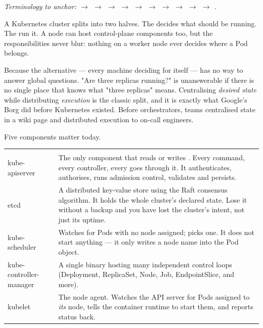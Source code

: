 \begin{center}\small\itshape\color{cInk!70}
Terminology to anchor:  $\rightarrow$  $\rightarrow$  $\rightarrow$  $\rightarrow$  $\rightarrow$  $\rightarrow$  $\rightarrow$  $\rightarrow$  $\rightarrow$  $\rightarrow$ .
\end{center}



 A Kubernetes cluster splits into two halves. The  decides what should be running. The  run it. A node can host control-plane components too, but the responsibilities never blur: nothing on a worker node ever decides where a Pod belongs.

 Because the alternative --- every machine deciding for itself --- has no way to answer global questions. "Are three replicas running?" is unanswerable if there is no single place that knows what "three replicas" means. Centralising \emph{desired state} while distributing \emph{execution} is the classic split, and it is exactly what Google's Borg did before Kubernetes existed. Before orchestrators, teams centralised state in a wiki page and distributed execution to on-call engineers.

 Five components matter today.

\begin{center}\small
\wbrowcolors
\begin{tabularx}{\linewidth}{@{}L{30mm} X@{}}
 & \\
kube-apiserver & The only component that reads or writes . Every  command, every controller, every  goes through it. It authenticates, authorises, runs admission control, validates and persists.\\
etcd & A distributed key-value store using the Raft consensus algorithm. It holds the whole cluster's declared state. Lose it without a backup and you have lost the cluster's intent, not just its uptime.\\
kube-scheduler & Watches for Pods with no node assigned; picks one. It does not start anything --- it only writes a node name into the Pod object.\\
kube-controller-manager & A single binary hosting many independent control loops (Deployment, ReplicaSet, Node, Job, EndpointSlice, and more).\\
kubelet & The node agent. Watches the API server for Pods assigned to \emph{its} node, tells the container runtime to start them, and reports status back.\\
\end{tabularx}
\end{center}

